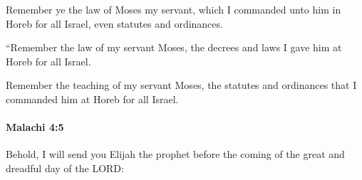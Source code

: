 			\begin{versebox}
					\item[BHS] 
					\item[LXX] 
					\item[ASV] Remember ye the law of Moses my servant, which I commanded unto him in Horeb for all Israel, even statutes and ordinances.
					\item[NIV] “Remember the law of my servant Moses, the decrees and laws I gave him at Horeb for all Israel.
					\item[NRSV] Remember the teaching of my servant Moses, the statutes and ordinances that I commanded him at Horeb for all Israel.
			\end{versebox}

		\paragraph{Malachi 4:5} %
			\label{MALACHI-4-5}

			Behold, I will send you Elijah the prophet before the coming of the great and dreadful day of the LORD:

